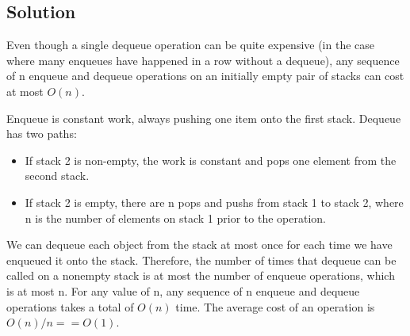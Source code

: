 \subsection*{Solution}

Even though a single dequeue operation can be quite expensive (in the case where many enqueues have happened in a row without a dequeue), any sequence of n enqueue and dequeue operations on an initially empty pair of stacks can cost at most $O(n)$. 

Enqueue is constant work, always pushing one item onto the first stack.
Dequeue has two paths:
\begin{itemize}
\item If stack 2 is non-empty, the work is constant and pops one element from the second stack.
\item If stack 2 is empty, there are n pops and pushs from stack 1 to stack 2, where n is the number of elements on stack 1 prior to the operation.
\end{itemize}

We can dequeue each object from the stack at most once for each time we have enqueued it onto the stack. Therefore, the number of times that dequeue can be called on a nonempty stack is at most the number of enqueue operations, which is at most n. For any value of n, any sequence of n enqueue and dequeue operations takes a total of $O(n)$ time. The average cost of an operation is $O(n)/n == O(1)$.

